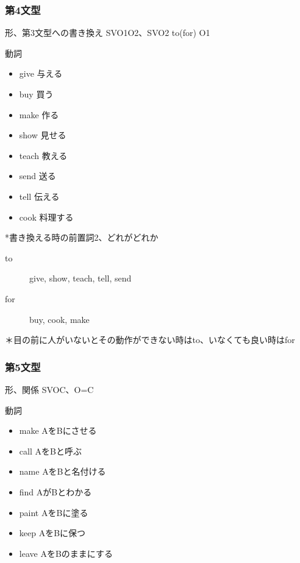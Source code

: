 \documentclass[10pt]{jsarticle}
\newcommand{\answer}[2]{{\color{orange}#2}}
\newcommand{\answer}[2]{\vspace{#1mm}}
\begin{document}
\subsubsection*{第4文型}
\begin{itembox}[l]{形、第3文型への書き換え}
	\answer{8}{SVO1O2、SVO2 to(for) O1}
\end{itembox}

\begin{itembox}[l]{動詞}

	\begin{multicols}{3}
		\begin{itemize}
			\item give \answer{5}{与える}
			\item buy \answer{5}{買う}
			\item make \answer{5}{作る}
			\item show \answer{5}{見せる}
			\item teach \answer{5}{教える}
			\item send \answer{5}{送る}
			\item tell \answer{5}{伝える}
			\item cook \answer{5}{料理する}
		\end{itemize}
	\end{multicols}
	*書き換える時の前置詞2、どれがどれか
	\answer{5}{
		\begin{description}
			\item[to] give, show, teach, tell, send
			\item[for] buy, cook, make
		\end{description}
		＊目の前に人がいないとその動作ができない時はto、いなくても良い時はfor
	}

\end{itembox}

\subsubsection*{第5文型}
\begin{itembox}[l]{形、関係}
	\answer{8}{SVOC、O=C}
\end{itembox}

\begin{itembox}[l]{動詞}
	\begin{multicols}{3}
		\begin{itemize}
			\item make \answer{5}{AをBにさせる}
			\item call \answer{5}{AをBと呼ぶ}
			\item name \answer{5}{AをBと名付ける}
			\item find \answer{5}{AがBとわかる}
			\item paint \answer{5}{AをBに塗る}
			\item keep \answer{5}{AをBに保つ}
			\item leave \answer{5}{AをBのままにする}
		\end{itemize}
	\end{multicols}
\end{itembox}
\end{document}
